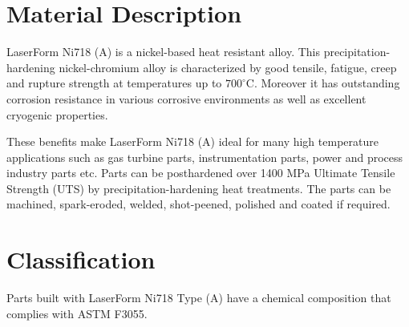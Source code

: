 \documentclass[10pt]{article}
\begin{document}
\section*{Material Description}
LaserForm Ni718 (A) is a nickel-based heat resistant alloy. This precipitation-hardening nickel-chromium alloy is characterized by good tensile, fatigue, creep and rupture strength at temperatures up to $700^{\circ} \mathrm{C}$. Moreover it has outstanding corrosion resistance in various corrosive environments as well as excellent cryogenic properties.

These benefits make LaserForm Ni718 (A) ideal for many high temperature applications such as gas turbine parts, instrumentation parts, power and process industry parts etc. Parts can be posthardened over 1400 MPa Ultimate Tensile Strength (UTS) by precipitation-hardening heat treatments. The parts can be machined, spark-eroded, welded, shot-peened, polished and coated if required.

\section*{Classification}
Parts built with LaserForm Ni718 Type (A) have a chemical composition that complies with ASTM F3055.
\end{document}
